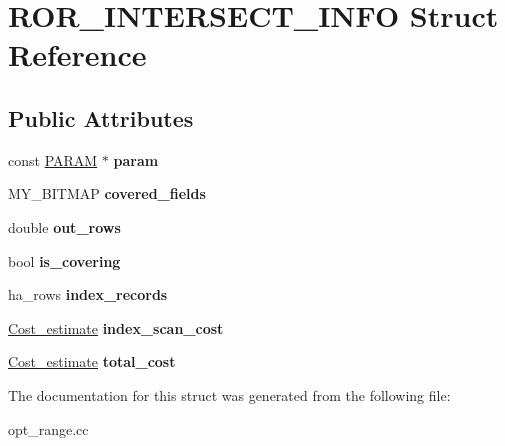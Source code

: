 \hypertarget{structROR__INTERSECT__INFO}{}\section{R\+O\+R\+\_\+\+I\+N\+T\+E\+R\+S\+E\+C\+T\+\_\+\+I\+N\+FO Struct Reference}
\label{structROR__INTERSECT__INFO}
\subsection*{Public Attributes}
\begin{DoxyCompactItemize}
\item 
\mbox{\label{structROR__INTERSECT__INFO_afd8de395807ca509b4090864b6cdada2}} 
const \mbox{\hyperlink{classPARAM}{P\+A\+R\+AM}} $\ast$ {\bfseries param}
\item 
\mbox{\label{structROR__INTERSECT__INFO_a713fc234b0bd78dbda595d5183487c73}} 
M\+Y\+\_\+\+B\+I\+T\+M\+AP {\bfseries covered\+\_\+fields}
\item 
\mbox{\label{structROR__INTERSECT__INFO_a8e983dd58c1136ff5341415e9bc03758}} 
double {\bfseries out\+\_\+rows}
\item 
\mbox{\label{structROR__INTERSECT__INFO_aaf14f26e30c7a80a2c3c06f193c0b353}} 
bool {\bfseries is\+\_\+covering}
\item 
\mbox{\label{structROR__INTERSECT__INFO_acf88558ccbcb97b6e9764ed98bd5285c}} 
ha\+\_\+rows {\bfseries index\+\_\+records}
\item 
\mbox{\label{structROR__INTERSECT__INFO_adb2c4e24528c1667d5656faf294fabfb}} 
\mbox{\hyperlink{classCost__estimate}{Cost\+\_\+estimate}} {\bfseries index\+\_\+scan\+\_\+cost}
\item 
\mbox{\label{structROR__INTERSECT__INFO_a56756734692c1581b22bd1e2c11c5a2f}} 
\mbox{\hyperlink{classCost__estimate}{Cost\+\_\+estimate}} {\bfseries total\+\_\+cost}
\end{DoxyCompactItemize}


The documentation for this struct was generated from the following file\+:\begin{DoxyCompactItemize}
\item 
opt\+\_\+range.\+cc\end{DoxyCompactItemize}

